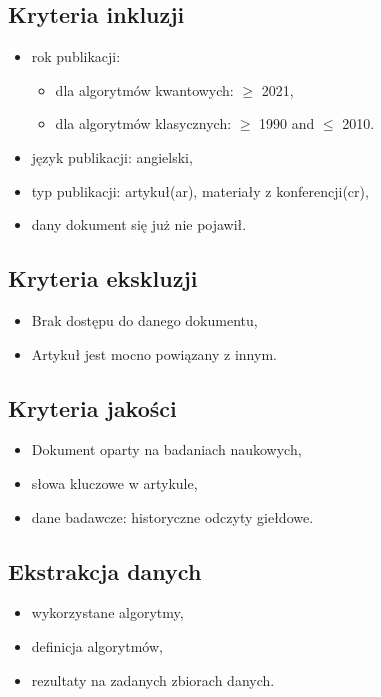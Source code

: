\documentclass[polish,envcountsect,10pt]{article}
\begin{document}
\subsection{Kryteria inkluzji}
\begin{itemize}
	\item rok publikacji: 
	\begin{itemize}
		\item dla algorytmów kwantowych: $\ge$ 2021,
		\item dla algorytmów klasycznych: $\ge$ 1990 and $\le$ 2010.
	\end{itemize}
	\item język publikacji: angielski,
	\item typ publikacji: artykuł(ar), materiały z konferencji(cr),
	\item dany dokument się już nie pojawił.
\end{itemize}

\subsection{Kryteria ekskluzji}

\begin{itemize}
	\item Brak dostępu do danego dokumentu,
	\item Artykuł jest mocno powiązany z innym.
\end{itemize}

\subsection{Kryteria jakości}

\begin{itemize}
	\item Dokument oparty na badaniach naukowych,
	\item słowa kluczowe w artykule,
	\item dane badawcze: historyczne odczyty giełdowe.
\end{itemize}

\subsection{Ekstrakcja danych}

\begin{itemize}
	\item wykorzystane algorytmy,
	\item definicja algorytmów,
	\item rezultaty na zadanych zbiorach danych.
\end{itemize}
\end{document}
